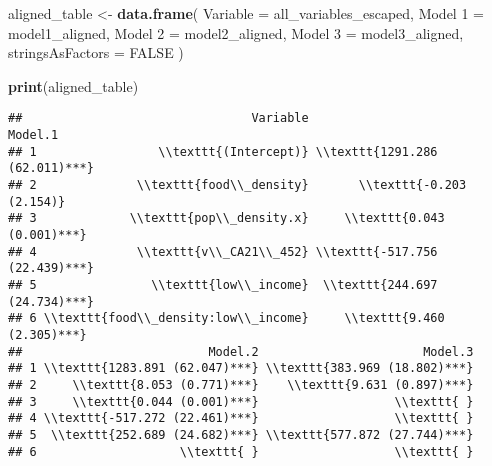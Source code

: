 \documentclass[
]{article}
\newenvironment{Shaded}{\begin{snugshade}}{\end{snugshade}}
\newcommand{\AttributeTok}[1]{\textcolor[rgb]{0.13,0.29,0.53}{#1}}
\newcommand{\ConstantTok}[1]{\textcolor[rgb]{0.56,0.35,0.01}{#1}}
\newcommand{\FunctionTok}[1]{\textcolor[rgb]{0.13,0.29,0.53}{\textbf{#1}}}
\newcommand{\NormalTok}[1]{#1}
\newcommand{\OtherTok}[1]{\textcolor[rgb]{0.56,0.35,0.01}{#1}}
\newcommand{\StringTok}[1]{\textcolor[rgb]{0.31,0.60,0.02}{#1}}
\begin{document}
\begin{Shaded}
\begin{Highlighting}[]
\NormalTok{aligned\_table }\OtherTok{\textless{}{-}} \FunctionTok{data.frame}\NormalTok{(}
  \AttributeTok{Variable =}\NormalTok{ all\_variables\_escaped,}
  \StringTok{\textasciigrave{}}\AttributeTok{Model 1}\StringTok{\textasciigrave{}} \OtherTok{=}\NormalTok{ model1\_aligned,}
  \StringTok{\textasciigrave{}}\AttributeTok{Model 2}\StringTok{\textasciigrave{}} \OtherTok{=}\NormalTok{ model2\_aligned,}
  \StringTok{\textasciigrave{}}\AttributeTok{Model 3}\StringTok{\textasciigrave{}} \OtherTok{=}\NormalTok{ model3\_aligned,}
  \AttributeTok{stringsAsFactors =} \ConstantTok{FALSE}
\NormalTok{)}

\FunctionTok{print}\NormalTok{(aligned\_table)}
\end{Highlighting}
\end{Shaded}

\begin{verbatim}
##                                Variable                        Model.1
## 1                 \\texttt{(Intercept)} \\texttt{1291.286 (62.011)***}
## 2              \\texttt{food\\_density}       \\texttt{-0.203 (2.154)}
## 3             \\texttt{pop\\_density.x}     \\texttt{0.043 (0.001)***}
## 4              \\texttt{v\\_CA21\\_452} \\texttt{-517.756 (22.439)***}
## 5                \\texttt{low\\_income}  \\texttt{244.697 (24.734)***}
## 6 \\texttt{food\\_density:low\\_income}     \\texttt{9.460 (2.305)***}
##                          Model.2                       Model.3
## 1 \\texttt{1283.891 (62.047)***} \\texttt{383.969 (18.802)***}
## 2     \\texttt{8.053 (0.771)***}    \\texttt{9.631 (0.897)***}
## 3     \\texttt{0.044 (0.001)***}                   \\texttt{ }
## 4 \\texttt{-517.272 (22.461)***}                   \\texttt{ }
## 5  \\texttt{252.689 (24.682)***} \\texttt{577.872 (27.744)***}
## 6                    \\texttt{ }                   \\texttt{ }
\end{verbatim}
\end{document}
